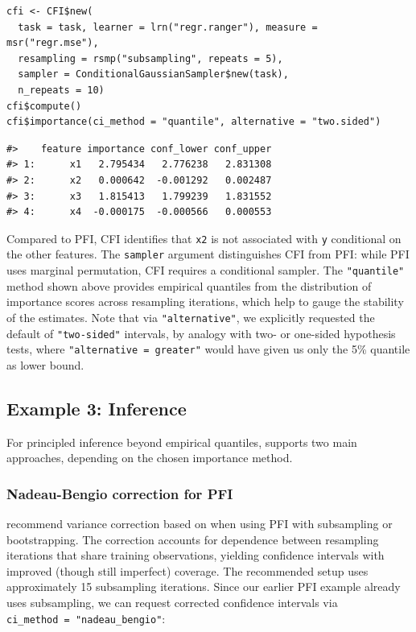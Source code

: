 \begin{verbatim}
cfi <- CFI$new(
  task = task, learner = lrn("regr.ranger"), measure = msr("regr.mse"),
  resampling = rsmp("subsampling", repeats = 5),
  sampler = ConditionalGaussianSampler$new(task),
  n_repeats = 10)
cfi$compute()
cfi$importance(ci_method = "quantile", alternative = "two.sided")
\end{verbatim}

\begin{verbatim}
#>    feature importance conf_lower conf_upper
#> 1:      x1   2.795434   2.776238   2.831308
#> 2:      x2   0.000642  -0.001292   0.002487
#> 3:      x3   1.815413   1.799239   1.831552
#> 4:      x4  -0.000175  -0.000566   0.000553
\end{verbatim}

Compared to PFI, CFI identifies that \texttt{x2} is not associated with \texttt{y} conditional on the other features.
The \texttt{sampler} argument distinguishes CFI from PFI: while PFI uses marginal permutation, CFI requires a conditional sampler.
The \texttt{"quantile"} method shown above provides empirical quantiles from the distribution of importance scores across resampling iterations, which help to gauge the stability of the estimates.
Note that via \texttt{"alternative"}, we explicitly requested the default of \texttt{"two-sided"} intervals, by analogy with two- or one-sided hypothesis tests, where \texttt{"alternative\ =\ \textquotesingle{}greater\textquotesingle{}"} would have given us only the 5\% quantile as lower bound.

\subsection{Example 3: Inference}\label{example-3-inference}

For principled inference beyond empirical quantiles,  supports two main approaches, depending on the chosen importance method.

\subsubsection{Nadeau-Bengio correction for PFI}\label{nadeau-bengio-correction-for-pfi}

\citet{molnar2023relatingpartialc} recommend variance correction based on \citet{nadeau2003inferencegeneralization} when using PFI with subsampling or bootstrapping.
The correction accounts for dependence between resampling iterations that share training observations, yielding confidence intervals with improved (though still imperfect) coverage.
The recommended setup uses approximately 15 subsampling iterations.
Since our earlier PFI example already uses subsampling, we can request corrected confidence intervals via \texttt{ci\_method\ =\ "nadeau\_bengio"}:

